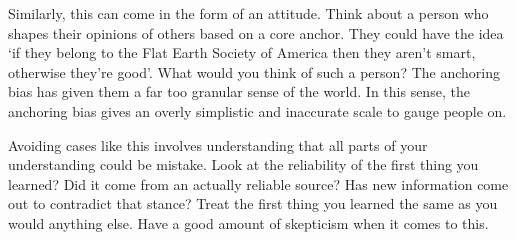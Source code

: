 Similarly, this can come in the form of an attitude. Think about a person who shapes their opinions of others based on a core anchor. They could have the idea `if they belong to the Flat Earth Society of America then they aren't smart, otherwise they're good'. What would you think of such a person? The anchoring bias has given them a far too granular sense of the world. In this sense, the anchoring bias gives an overly simplistic and inaccurate scale to gauge people on. 

Avoiding cases like this involves understanding that all parts of your understanding could be mistake. Look at the reliability of the first thing you learned? Did it come from an actually reliable source? Has new information come out to contradict that stance? Treat the first thing you learned the same as you would anything else. Have a good amount of skepticism when it comes to this.
